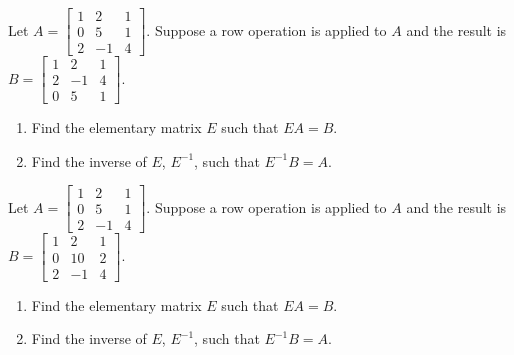 \documentclass{ximera}
\begin{document}
\begin{problem}\label{prb:4.57}
Let $A = \left[ \begin{array}{rrr}
1 & 2 & 1  \\
0 & 5 & 1 \\
2 & -1 & 4
\end{array}\right]$. Suppose a row operation is applied to $A$ and the result is $B = \left[ \begin{array}{rrr}
1 & 2 & 1\\
2 & -1 & 4 \\
0 & 5 & 1
\end{array}\right]$.
\begin{enumerate}
\item Find the elementary matrix $E$ such that $EA = B$.

\item Find the inverse of $E$, $E^{-1}$, such that $E^{-1}B = A$.
\end{enumerate}
\end{problem}

\begin{problem}\label{prb:4.58}
Let $A = \left[ \begin{array}{rrr}
1 & 2 & 1  \\
0 & 5 & 1 \\
2 & -1 & 4
\end{array}\right]$. Suppose a row operation is applied to $A$ and the result is $B = \left[ \begin{array}{rrr}
1 & 2 & 1\\
0 & 10 & 2 \\
2 & -1 & 4
\end{array}\right]$.
\begin{enumerate}
\item Find the elementary matrix $E$ such that $EA = B$.

\item Find the inverse of $E$, $E^{-1}$, such that $E^{-1}B = A$.
\end{enumerate}
\end{problem}
\end{document}
